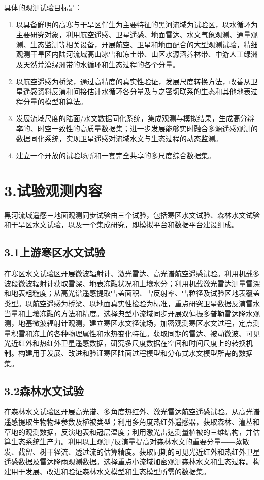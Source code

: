 \documentclass[letterpaper,10pt,english]{sphinxmanual}
\begin{document}
具体的观测试验目标是：
\begin{enumerate}
\item {} 
以具备鲜明的高寒与干旱区伴生为主要特征的黑河流域为试验区，以水循环为主要研究对象，利用航空遥感、卫星遥感、地面雷达、水文气象观测、通量观测、生态监测等相关设备，开展航空、卫星和地面配合的大型观测试验，精细观测干旱区内陆河流域高山冰雪和冻土带、山区水源涵养林带、中游人工绿洲及天然荒漠绿洲带的水循环和生态过程的各个分量。

\item {} 
以航空遥感为桥梁，通过高精度的真实性验证，发展尺度转换方法，改善从卫星遥感资料反演和间接估计水循环各分量及与之密切联系的生态和其他地表过程分量的模型和算法。

\item {} 
发展流域尺度的陆面/水文数据同化系统，集成观测与模拟结果，生成高分辨率的、时空一致性的高质量数据集；进一步发展能够实时融合多源遥感观测的数据同化系统，实现卫星遥感对流域水文与生态过程的动态监测。

\item {} 
建立一个开放的试验场所和一套完全共享的多尺度综合数据集。

\end{enumerate}


\section{3.试验观测内容}
\label{water_aims:id21}
黑河流域遥感－地面观测同步试验由三个试验，包括寒区水文试验、森林水文试验和干旱区水文试验，以及一个集成研究，即模拟平台和数据平台建设组成。


\subsection{3.1上游寒区水文试验}
\label{water_aims:id22}
在寒区水文试验区开展微波辐射计、激光雷达、高光谱航空遥感试验。利用机载多波段微波辐射计获取雪深、地表冻融状况和土壤水分；利用机载激光雷达测量雪深和地表粗糙度；从高光谱遥感提取雪盖面积、雪反射率、雪粒径及试验区地表覆盖类型。以航空遥感为桥梁、以地面真实性检验为标准，重点研究卫星数据反演雪水当量和土壤冻融的方法和精度。选择典型小流域同步开展双偏振多普勒雷达降水观测，地基微波辐射计观测，建立寒区水文径流场，加密观测寒区水文过程，定点测量积雪和冻土的各种物理属性和水热变化特征。获取同期的雷达、被动微波、可见光近红外和热红外卫星遥感数据，研究多尺度数据在空间和时间尺度上的转换机制。构建用于发展、改进和验证寒区陆面过程模型和分布式水文模型所需的数据集。


\subsection{3.2森林水文试验}
\label{water_aims:id23}
在森林水文试验区开展高光谱、多角度热红外、激光雷达航空遥感试验。从高光谱遥感提取生物物理参数及植被类型；利用多角度热红外遥感器，获取森林、灌丛和草地的观测数据，反演地表和冠层温度；利用激光雷达测量植被的三维结构，并估算生态系统生产力。利用以上观测/反演量提高对森林水文的重要分量――蒸散发、截留、树干径流、透过流的估算精度。获取同期的可见光近红外和热红外卫星遥感数据及雷达降雨观测数据。选择重点小流域加密观测森林水文和生态过程。构建用于发展、改进和验证森林水文模型和生态模型所需的数据集。
\end{document}
